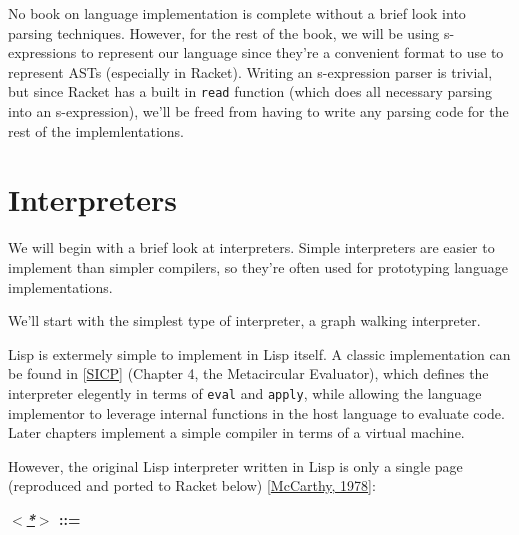 \documentclass{book}
\newcommand{\sectionNewpage}{}
\newcommand{\Scribtexttt}[1]{{\texttt{#1}}}
\newcommand{\plainlink}[1]{#1}
\let\SOriginalthesubsection\thesubsection
\newcommand{\Ssection}[2]{\section[#1]{#2}\let\thesubsection\SOriginalthesubsection}
\renewcommand{\Ssection}[2]{\chapter[#1]{#2}}
\begin{document}
No book on language implementation is complete without a brief look into
parsing techniques. However, for the rest of the book, we will be using
s{-}expressions to represent our language since they{'}re a convenient
format to use to represent ASTs (especially in Racket). Writing an
s{-}expression parser is trivial, but since Racket has a built in \Scribtexttt{read}
function (which does all necessary parsing into an s{-}expression), we{'}ll be
freed from having to write any parsing code for the rest of the
implemlentations.

\sectionNewpage

\Ssection{Interpreters}{Interpreters}\label{t:x28part_x22Interpretersx22x29}

We will begin with a brief look at interpreters. Simple interpreters are
easier to implement than simpler compilers, so they{'}re often used for
prototyping language implementations.

We{'}ll start with the simplest type of interpreter, a graph walking interpreter.

Lisp is extermely simple to implement in Lisp itself. A classic implementation
can be found in [\hyperref[t:x28cite_x22SICPx22x29]{SICP}] (Chapter 4, the Metacircular Evaluator), which
defines the interpreter elegently in terms of \Scribtexttt{eval} and \Scribtexttt{apply},
while allowing the language implementor to leverage internal functions in
the host language to evaluate code. Later chapters implement a simple
compiler in terms of a virtual machine.

However, the original Lisp interpreter written in Lisp is only a single page
(reproduced and ported to Racket below) [\hyperref[t:x28cite_x22McCarthyx2c_1978x22x29]{McCarthy, 1978}]:

\label{t:x28elem_x28chunk_x22x3cx2ax3ex3a1x22x29x29}\textbf{\textit{\hyperref[t:x28elem_x28chunk_x22x3cx2ax3ex3a1x22x29x29]{\plainlink{$<$*$>$}}} ::=}
\end{document}

